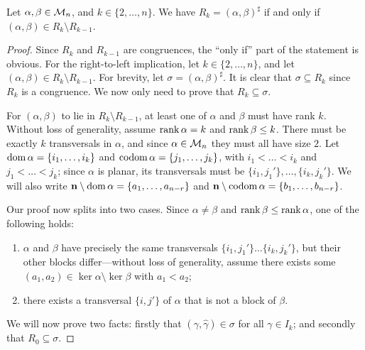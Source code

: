\begin{lemma}
  \label{lem:rees-genpairs}
  Let $\alpha,\beta \in \mathcal{M}_n$, and $k \in \{2, \ldots, n\}$.  We have
  $R_k = (\alpha, \beta)^\sharp$ if and only if
  $(\alpha, \beta) \in R_k \setminus R_{k-1}$.
  \begin{proof}
    Since $R_k$ and $R_{k-1}$ are congruences, the ``only if'' part of the
    statement is obvious.  For the right-to-left implication, let
    $k \in \{2, \ldots, n\}$, and let
    $(\alpha, \beta) \in R_k \setminus R_{k-1}$.  For brevity, let
    $\sigma = (\alpha, \beta)^\sharp$.  It is clear that $\sigma \subseteq R_k$
    since $R_k$ is a congruence.  We now only need to prove that
    $R_k \subseteq \sigma$.

    For $(\alpha, \beta)$ to lie in $R_k \setminus R_{k-1}$, at least one of
    $\alpha$ and $\beta$ must have rank $k$.  Without loss of generality, assume
    $\operatorname{rank}\alpha = k$ and $\operatorname{rank}\beta \leq k$.  There must be exactly $k$
    transversals in $\alpha$, and since $\alpha \in \mathcal{M}_n$ they must all have
    size $2$.  Let $\operatorname{dom}\alpha = \{i_1, \ldots, i_k\}$ and
    $\operatorname{codom}\alpha = \{j_1, \ldots, j_k\}$, with $i_1 < \ldots < i_k$ and
    $j_1 < \ldots < j_k$; since $\alpha$ is planar, its transversals must be
    $\{i_1, j_1'\}, \ldots, \{i_k, j_k'\}$.  We will also write
    $\mathbf{n} \setminus \operatorname{dom}\alpha = \{a_1, \ldots, a_{n-r}\}$ and
    $\mathbf{n} \setminus \operatorname{codom}\alpha = \{b_1, \ldots, b_{n-r}\}$.

    Our proof now splits into two cases.  Since $\alpha \neq \beta$ and
    $\operatorname{rank}\beta \leq \operatorname{rank}\alpha$, one of the following holds:
    \begin{enumerate}[\rm(a)]
    \item $\alpha$ and $\beta$ have precisely the same transversals
      $\{i_1, j_1'\} \ldots \{i_k, j_k'\}$, but their other blocks
      differ---without loss of generality, assume there exists some
      $(a_1,a_2) \in \ker\alpha \setminus \ker\beta$ with $a_1 < a_2$;
    \item there exists a transversal $\{i,j'\}$ of $\alpha$ that is not a block
      of $\beta$.
    \end{enumerate}
    We will now prove two facts: firstly that
    $(\gamma, \widehat\gamma) \in \sigma$ for all $\gamma \in I_k$; and secondly
    that $R_0 \subseteq \sigma$.


\end{proof}
\end{lemma}
